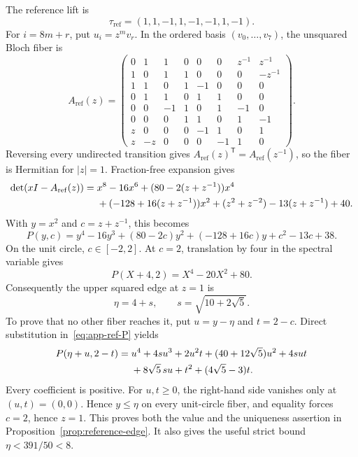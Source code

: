 The reference lift is
\[
 \tau_{\mathrm{ref}}=(1,1,-1,1,-1,-1,1,-1).
\]
For \(i=8m+r\), put \(u_i=z^m v_r\).  In the ordered basis
\((v_0,\ldots,v_7)\), the unsquared Bloch fiber is
{\small
\[
A_{\mathrm{ref}}(z)=
\begin{pmatrix}
0&1&1&0&0&0&z^{-1}&z^{-1}\\
1&0&1&1&0&0&0&-z^{-1}\\
1&1&0&1&-1&0&0&0\\
0&1&1&0&1&1&0&0\\
0&0&-1&1&0&1&-1&0\\
0&0&0&1&1&0&1&-1\\
z&0&0&0&-1&1&0&1\\
z&-z&0&0&0&-1&1&0
\end{pmatrix}.
\]
}
Reversing every undirected transition gives
\(A_{\mathrm{ref}}(z)^{\mathsf T}=A_{\mathrm{ref}}(z^{-1})\), so the
fiber is Hermitian for \(|z|=1\).  Fraction-free expansion gives
\begin{align}
\det(xI-A_{\mathrm{ref}}(z))={}&x^8-16x^6
 +(80-2(z+z^{-1}))x^4 \notag\\
&+(-128+16(z+z^{-1}))x^2
 +(z^2+z^{-2})-13(z+z^{-1})+40.       \label{eq:app-ref-det}
\end{align}
With \(y=x^2\) and \(c=z+z^{-1}\), this becomes
\begin{equation}
 P(y,c)=y^4-16y^3+(80-2c)y^2+(-128+16c)y
        +c^2-13c+38.                 \label{eq:app-ref-P}
\end{equation}
On the unit circle, \(c\in[-2,2]\).  At \(c=2\), translation by four in
the spectral variable gives
\[
 P(X+4,2)=X^4-20X^2+80.
\]
Consequently the upper squared edge at \(z=1\) is
\[
 \eta=4+s,
 \qquad s=\sqrt{10+2\sqrt5}.
\]
To prove that no other fiber reaches it, put \(u=y-\eta\) and \(t=2-c\).
Direct substitution in~\eqref{eq:app-ref-P} yields
\begin{align}
P(\eta+u,2-t)={}&u^4+4su^3+2u^2t
 +(40+12\sqrt5)u^2+4sut \notag\\
&+8\sqrt5\,su+t^2+(4\sqrt5-3)t.      \label{eq:app-edge-positive}
\end{align}
Every coefficient is positive.  For \(u,t\geq0\), the right-hand side
vanishes only at \((u,t)=(0,0)\).  Hence \(y\leq\eta\) on every unit-circle
fiber, and equality forces \(c=2\), hence \(z=1\).  This proves both the
value and the uniqueness assertion in
Proposition~\ref{prop:reference-edge}.  It also gives the useful strict
bound \(\eta<391/50<8\).

